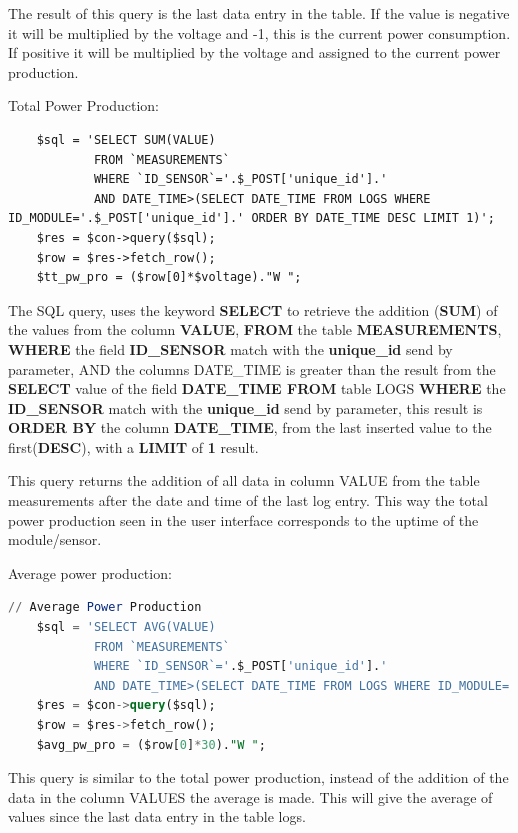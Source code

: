 The result of this query is the last data entry in the table. If the value is negative it will be multiplied by the voltage and -1, this is the current power consumption. If positive it will be multiplied by the voltage and assigned to the current power production.

Total Power Production:
\begin{lstlisting}
	$sql = 'SELECT SUM(VALUE) 
			FROM `MEASUREMENTS` 
			WHERE `ID_SENSOR`='.$_POST['unique_id'].'
			AND DATE_TIME>(SELECT DATE_TIME FROM LOGS WHERE ID_MODULE='.$_POST['unique_id'].' ORDER BY DATE_TIME DESC LIMIT 1)';
	$res = $con->query($sql);
	$row = $res->fetch_row();
	$tt_pw_pro = ($row[0]*$voltage)."W ";
\end{lstlisting}

The SQL query, uses the keyword \textbf{SELECT} to retrieve the addition (\textbf{SUM}) of the values from the column \textbf{VALUE}, \textbf{FROM} the table \textbf{MEASUREMENTS}, \textbf{WHERE} the field \textbf{ID\_SENSOR} match with the \textbf{unique\_id} send by parameter, AND the columns DATE\_TIME is greater than the result from the  \textbf{SELECT} value of the field \textbf{DATE\_TIME FROM} table LOGS \textbf{WHERE} the \textbf{ID\_SENSOR} match with the \textbf{unique\_id} send by parameter, this result is \textbf{ORDER BY} the column \textbf{DATE\_TIME}, from the last inserted value to the first(\textbf{DESC}), with a \textbf{LIMIT} of \textbf{1} result.

This query returns the addition of all data in column VALUE from the table measurements after the date and time of the last log entry. This way the total power production seen in the user interface corresponds to the uptime of the module/sensor.

Average power production:
\begin{lstlisting}[language=sql]
	// Average Power Production
	$sql = 'SELECT AVG(VALUE) 
			FROM `MEASUREMENTS` 
			WHERE `ID_SENSOR`='.$_POST['unique_id'].'
			AND DATE_TIME>(SELECT DATE_TIME FROM LOGS WHERE ID_MODULE='.$_POST['unique_id'].' ORDER BY DATE_TIME DESC LIMIT 1)';
	$res = $con->query($sql);
	$row = $res->fetch_row();
	$avg_pw_pro = ($row[0]*30)."W ";
\end{lstlisting}

This query is similar to the total power production, instead of the addition of the data in the column VALUES the average is made. This will give the average of values since the last data entry in the table logs.


